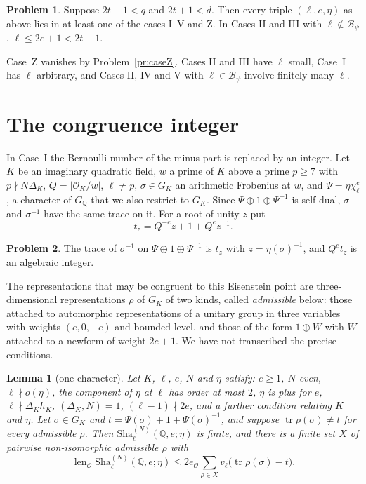 \documentclass[reqno]{amsart}
\theoremstyle{definition}
\newtheorem{problem}{Problem}[section]
\theoremstyle{plain}
\newtheorem{lemma}[theorem]{Lemma}
\theoremstyle{remark}
\newcommand{\Q}{\mathbb{Q}}
\newcommand{\Oc}{\mathcal{O}}
\newcommand{\Bc}{\mathcal{B}}
\newcommand{\tr}{\operatorname{tr}}
\newcommand{\len}{\operatorname{len}}
\newcommand{\Sha}{\mathrm{Sha}}
\begin{document}
\begin{problem}\label{pr:exhaustive}
Suppose \(2t+1<q\) and \(2t+1<d\).  Then every triple \((\ell,e,\eta)\) as above lies in at least one of the cases I--V and Z.  In Cases II and III with \(\ell\notin\Bc_\psi\), \(\ell\le2e+1<2t+1\).
\end{problem}

Case~Z vanishes by Problem~\ref{pr:caseZ}.  Cases II and III have \(\ell\) small, Case~I has \(\ell\) arbitrary, and Cases II, IV and V with \(\ell\in\Bc_\psi\) involve finitely many \(\ell\).

\section{The congruence integer}\label{sec:integer}

In Case~I the Bernoulli number of the minus part is replaced by an integer.  Let \(K\) be an imaginary quadratic field, \(w\) a prime of \(K\) above a prime \(p\ge7\) with \(p\nmid N\Delta_K\), \(Q=\lvert\Oc_K/w\rvert\), \(\ell\ne p\), \(\sigma\in G_K\) an arithmetic Frobenius at \(w\), and \(\Psi=\eta\chi_\ell^e\), a character of \(G_\Q\) that we also restrict to \(G_K\).  Since \(\Psi\oplus1\oplus\Psi^{-1}\) is self-dual, \(\sigma\) and \(\sigma^{-1}\) have the same trace on it.  For a root of unity \(z\) put
\[
 t_z=Q^{-e}z+1+Q^ez^{-1}.
\]

\begin{problem}\label{pr:eis-trace}
The trace of \(\sigma^{-1}\) on \(\Psi\oplus1\oplus\Psi^{-1}\) is \(t_z\) with \(z=\eta(\sigma)^{-1}\), and \(Q^et_z\) is an algebraic integer.
\end{problem}

The representations that may be congruent to this Eisenstein point are three-dimensional representations \(\rho\) of \(G_K\) of two kinds, called \emph{admissible} below: those attached to automorphic representations of a unitary group in three variables with weights \((e,0,-e)\) and bounded level, and those of the form \(1\oplus W\) with \(W\) attached to a newform of weight \(2e+1\).  We have not transcribed the precise conditions.

\begin{lemma}[one character]\label{lem:one}
Let \(K\), \(\ell\), \(e\), \(N\) and \(\eta\) satisfy: \(e\ge1\), \(N\) even, \(\ell\nmid o(\eta)\), the component of \(\eta\) at \(\ell\) has order at most \(2\), \(\eta\) is plus for \(e\), \(\ell\nmid\Delta_Kh_K\), \((\Delta_K,N)=1\), \((\ell-1)\nmid2e\), and a further condition relating \(K\) and \(\eta\).  Let \(\sigma\in G_K\) and \(t=\Psi(\sigma)+1+\Psi(\sigma)^{-1}\), and suppose \(\tr\rho(\sigma)\ne t\) for every admissible \(\rho\).  Then \(\Sha^{(N)}_\ell(\Q,e;\eta)\) is finite, and there is a finite set \(X\) of pairwise non-isomorphic admissible \(\rho\) with
\[
 \len_\Oc\Sha^{(N)}_\ell(\Q,e;\eta)\le2e_\Oc\sum_{\rho\in X}v_\ell\bigl(\tr\rho(\sigma)-t\bigr).
\]
\end{lemma}
\end{document}
